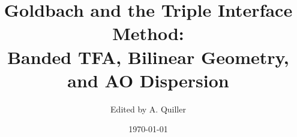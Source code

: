 \documentclass[11pt]{article}
\title{Goldbach and the Triple Interface Method:\\Banded TFA, Bilinear Geometry, and AO Dispersion}
\author{Edited by A. Quiller}
\date{\today}
\numberwithin{equation}{section}
\newcommand{\1}{\mathbf{1}}
\begin{document}
\maketitle
\tableofcontents






\appendix


\nocite{*}
\printbibliography
\end{document}
